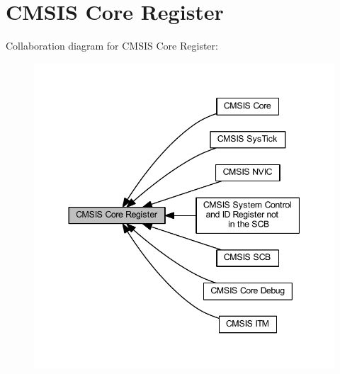 \hypertarget{group___c_m_s_i_s__core__register}{}\section{C\+M\+S\+IS Core Register}
\label{group___c_m_s_i_s__core__register}
Collaboration diagram for C\+M\+S\+IS Core Register\+:
\nopagebreak
\begin{figure}[H]
\begin{center}
\leavevmode
\includegraphics[width=344pt]{group___c_m_s_i_s__core__register}
\end{center}
\end{figure}
